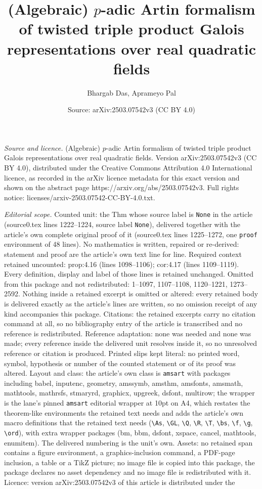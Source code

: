 \documentclass[10pt,a4paper]{amsart}
\title[(Algebraic) $ p $-adic Artin formalism of twisted triple pro]{(Algebraic) $ p $-adic Artin formalism of twisted triple product Galois representations over real quadratic fields}
\author{Bhargab Das, Aprameyo Pal}
\date{Source: arXiv:2503.07542v3 (CC BY 4.0)}
\begin{document}
\maketitle

\noindent\emph{Source and licence.} (Algebraic) $ p $-adic Artin formalism of twisted triple product Galois representations over real quadratic fields. Version arXiv:2503.07542v3 (CC BY 4.0), distributed under the Creative Commons Attribution 4.0 International licence, as recorded in the arXiv licence metadata for this exact version and shown on the abstract page https://arxiv.org/abs/2503.07542v3. Full rights notice: licenses/arxiv-2503.07542-CC-BY-4.0.txt.\par\smallskip

\noindent\textit{Editorial scope.} Counted unit: the Thm whose source label is \texttt{None} in the article (source0.tex lines 1222--1224, source label \texttt{None}), delivered together with the article's own complete original proof of it (source0.tex lines 1225--1272, one \texttt{proof} environment of 48 lines). No mathematics is written, repaired or re-derived: statement and proof are the article's own text line for line. Required context retained uncounted: prop:4.16 (lines 1098--1106); cor:4.17 (lines 1109--1119). Every definition, display and label of those lines is retained unchanged. Omitted from this package and not redistributed: 1--1097, 1107--1108, 1120--1221, 1273--2592. Nothing inside a retained excerpt is omitted or altered: every retained body is delivered exactly as the article's lines are written, so no omission receipt of any kind accompanies this package. Citations: the retained excerpts carry no citation command at all, so no bibliography entry of the article is transcribed and no reference is redistributed. Reference adaptation: none was needed and none was made; every reference inside the delivered unit resolves inside it, so no unresolved reference or citation is produced. Printed slips kept literal: no printed word, symbol, hypothesis or number of the counted statement or of its proof was altered. Layout and class: the article's own class is \texttt{amsart} with packages including babel, inputenc, geometry, amssymb, amsthm, amsfonts, amsmath, mathtools, mathrsfs, stmaryrd, graphicx, upgreek, dsfont, multirow; the wrapper is the lane's pinned \texttt{amsart} editorial wrapper at 10pt on A4, which restates the theorem-like environments the retained text needs and adds the article's own macro definitions that the retained text needs (\texttt{\textbackslash As}, \texttt{\textbackslash GL}, \texttt{\textbackslash Q}, \texttt{\textbackslash R}, \texttt{\textbackslash T}, \texttt{\textbackslash bs}, \texttt{\textbackslash f}, \texttt{\textbackslash g}, \texttt{\textbackslash ord}), with extra wrapper packages (bm, bbm, dsfont, xspace, cancel, mathtools, enumitem). The delivered numbering is the unit's own. Assets: no retained span contains a figure environment, a graphics-inclusion command, a PDF-page inclusion, a table or a TikZ picture; no image file is copied into this package, the package declares no asset dependency and no image file is redistributed with it. Licence: version arXiv:2503.07542v3 of this article is distributed under the 
\end{document}
